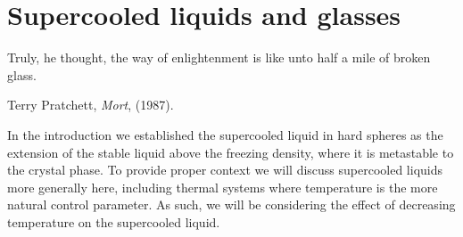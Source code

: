 \documentclass[11pt,twoside]{report}
\begin{document}
\chapter{Supercooled liquids and glasses}
\epigraph{Truly, he thought, the way of enlightenment is like unto half a mile of broken glass.}{Terry Pratchett, \emph{Mort}, (1987).}
\label{chapter:glass}

In the introduction we established the supercooled liquid in hard spheres as the extension of the stable liquid above the freezing density, where it is metastable to the crystal phase.
To provide proper context we will discuss supercooled liquids more generally here, including thermal systems where temperature is the more natural control parameter.
As such, we will be considering the effect of decreasing temperature on the supercooled liquid.






\end{document}
